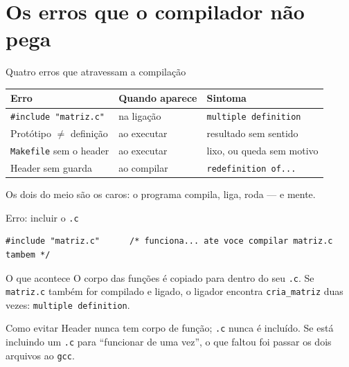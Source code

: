 \documentclass[aspectratio=169]{beamer}
\begin{document}
\section{Os erros que o compilador não pega}

\begin{frame}{Quatro erros que atravessam a compilação}
  \begin{center}
  \small
  \begin{tabular}{@{}lll@{}}
    \toprule
    \textbf{Erro} & \textbf{Quando aparece} & \textbf{Sintoma} \\
    \midrule
    \texttt{\#include "matriz.c"}   & na ligação  & \texttt{multiple definition} \\
    Protótipo $\neq$ definição      & ao executar & resultado sem sentido \\
    \texttt{Makefile} sem o header  & ao executar & lixo, ou queda sem motivo \\
    Header sem guarda               & ao compilar & \texttt{redefinition of...} \\
    \bottomrule
  \end{tabular}
  \end{center}
  \begin{block}{}
    \small Os dois do meio são os caros: o programa compila, liga, roda --- e
    mente.
  \end{block}
\end{frame}

\begin{frame}[fragile]{Erro: incluir o \texttt{.c}}
\begin{lstlisting}[basicstyle=\ttfamily\scriptsize, numbers=none]
#include "matriz.c"      /* funciona... ate voce compilar matriz.c tambem */
\end{lstlisting}
  \begin{block}{O que acontece}
    \small O corpo das funções é copiado para dentro do seu \texttt{.c}. Se
    \texttt{matriz.c} também for compilado e ligado, o ligador encontra
    \texttt{cria\_matriz} duas vezes: \texttt{multiple definition}.
  \end{block}
  \begin{block}{Como evitar}
    \small Header nunca tem corpo de função; \texttt{.c} nunca é incluído.
    Se está incluindo um \texttt{.c} para ``funcionar de uma vez'', o que
    faltou foi passar os dois arquivos ao \texttt{gcc}.
  \end{block}
\end{frame}
\end{document}
